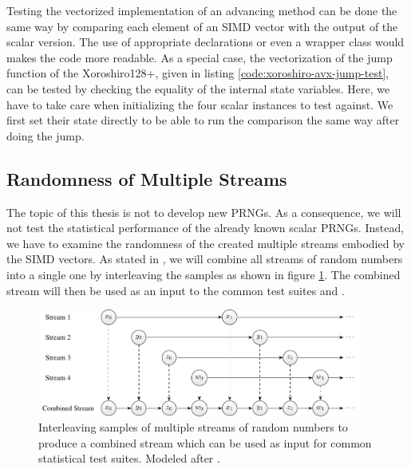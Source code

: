 \documentclass{stdlocal}
\begin{document}
    Testing the vectorized implementation of an advancing method can be done the same way by comparing each element of an SIMD vector with the output of the scalar version.
    The use of appropriate  declarations or even a wrapper class would makes the code more readable.
    As a special case, the vectorization of the jump function of the Xoroshiro128+, given in listing \ref{code:xoroshiro-avx-jump-test}, can be tested by checking the equality of the internal state variables.
    Here, we have to take care when initializing the four scalar instances to test against.
    We first set their state directly to be able to run the comparison the same way after doing the jump.


  \subsection{Randomness of Multiple Streams} %
  \label{sub:statistical_testing}
    The topic of this thesis is not to develop new PRNGs.
    As a consequence, we will not test the statistical performance of the already known scalar PRNGs.
    Instead, we have to examine the randomness of the created multiple streams embodied by the SIMD vectors.
    As stated in \textcite[\ppno~160-162]{kneusel2018}, we will combine all streams of random numbers into a single one by interleaving the samples as shown in figure \ref{fig:combined-stream}.
    The combined stream will then be used as an input to the common test suites  and  \autocite{testu01,dieharder}.
    \begin{figure}
      \center
      \includegraphics[width=0.95\textwidth]{figures/interleaving_multiple_streams.pdf}
      \caption[Combined Stream by Interleaving Samples of Multiple Streams]{%
        Interleaving samples of multiple streams of random numbers to produce a combined stream which can be used as input for common statistical test suites.
        Modeled after \textcite[\pno~161]{kneusel2018}.
      }
      \label{fig:combined-stream}
    \end{figure}
\end{document}
